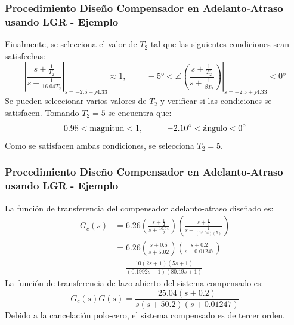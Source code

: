 \documentclass[aspectratio=169,handout]{beamer}
\theoremstyle{definition}
\theoremstyle{plain}
\theoremstyle{remark}
\begin{document}
\begin{frame}[<+->]\frametitle{Procedimiento Diseño Compensador en Adelanto-Atraso usando LGR - Ejemplo}
	Finalmente, se selecciona el valor de $T_2$ tal que las siguientes condiciones sean satisfechas:
	\begin{equation*}
		\left| \frac{s+\frac{1}{T_2}}{s+\frac{1}{16.04 T_2}} \right|_{s=-2.5 + j4.33} \approx 1, \hspace{1cm}
		-\ang{5} < \angle\left.\left( \frac{s+\frac{1}{T_2}}{s+\frac{1}{\beta T_2}} \right) \right|_{s=-2.5 + j4.33} < \ang{0}
	\end{equation*}
	\pause
	Se pueden seleccionar varios valores de $T_2$ y verificar si las condiciones se satisfacen. Tomando $T_2 = 5$ se encuentra que:
	\begin{equation*}
		0.98 < \text{magnitud} < 1, \hspace*{1cm} -\ang{2.10} < \text{ángulo} < \ang{0}
	\end{equation*}
	\pause
	Como se satisfacen ambas condiciones, se selecciona $T_2 = 5$.
\end{frame}

\begin{frame}[<+->]\frametitle{Procedimiento Diseño Compensador en Adelanto-Atraso usando LGR - Ejemplo}
	La función de transferencia del compensador adelanto-atraso diseñado es:
	\begin{align*}
		G_c(s) &= 6.26 \left( \frac{s+\frac{1}{2}}{s+\frac{10.04}{2}} \right) \left( \frac{s+\frac{1}{5}}{s+\frac{1}{(16.04)(5)}} \right)\\
		&= 6.26\left( \frac{s+0.5}{s+5.02} \right)\left( \frac{s+0.2}{s+0.01247} \right)\\
		&= \frac{10(2s+1)(5s+1)}{(0.1992s+1)(80.19s+1)}
	\end{align*}
	\pause
	La función de transferencia de lazo abierto del sistema compensado es:
	\begin{equation*}
		G_c(s)G(s) = \frac{25.04(s+0.2)}{s(s+50.2)(s+0.01247)}
	\end{equation*}
	\pause
	Debido a la cancelación polo-cero, el sistema compensado es de tercer orden.
\end{frame}
\end{document}
